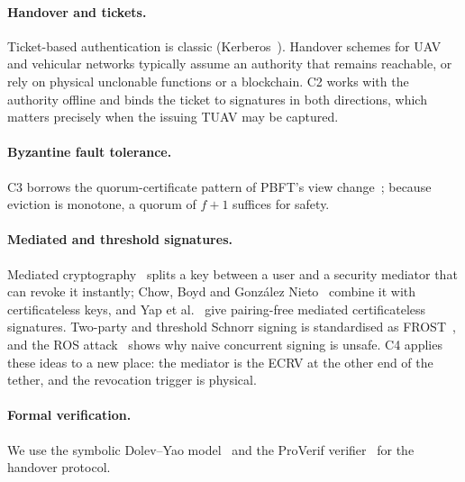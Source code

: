 \paragraph{Handover and tickets.}
Ticket-based authentication is classic (Kerberos~\cite{kerberos94}). Handover schemes for UAV and vehicular networks typically assume an authority that
remains reachable, or rely on physical unclonable functions or a blockchain. C2 works with the authority offline and binds the ticket to signatures in both
directions, which matters precisely when the issuing TUAV may be captured.

\paragraph{Byzantine fault tolerance.}
C3 borrows the quorum-certificate pattern of PBFT's view change~\cite{castro99}; because eviction is monotone, a quorum of $f+1$ suffices for safety.

\paragraph{Mediated and threshold signatures.}
Mediated cryptography~\cite{bdtw01} splits a key between a user and a security mediator that can revoke it instantly; Chow, Boyd and Gonz\'alez
Nieto~\cite{cbn06} combine it with certificateless keys, and Yap et al.~\cite{yap07} give pairing-free mediated certificateless signatures. Two-party and
threshold Schnorr signing is standardised as FROST~\cite{frost20,rfc9591}, and the ROS attack~\cite{ros21} shows why naive concurrent signing is unsafe.
C4 applies these ideas to a new place: the mediator is the ECRV at the other end of the tether, and the revocation trigger is physical.

\paragraph{Formal verification.}
We use the symbolic Dolev--Yao model~\cite{dolevyao} and the ProVerif verifier~\cite{blanchet16} for the handover protocol.
